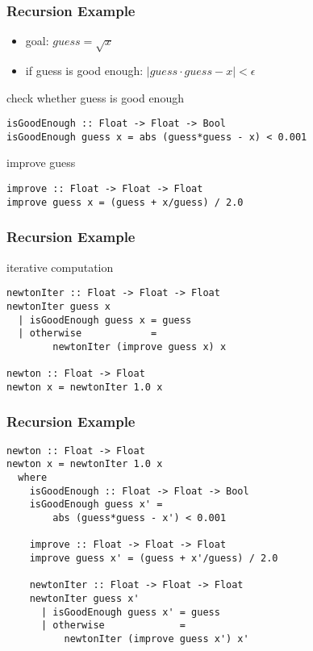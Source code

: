 \documentclass[dvipsnames]{beamer}
\theoremstyle{plain}
\begin{document}
\begin{frame}[fragile]
  \frametitle{Recursion Example}

  \begin{itemize}
    \item goal: $guess = \sqrt x$
    \item if guess is good enough: $|guess \cdot guess - x| < \epsilon$
  \end{itemize}

  \pause
  \begin{exampleblock}{check whether guess is good enough}
    \begin{lstlisting}
isGoodEnough :: Float -> Float -> Bool
isGoodEnough guess x = abs (guess*guess - x) < 0.001
    \end{lstlisting}
  \end{exampleblock}

  \pause
  \begin{exampleblock}{improve guess}
    \begin{lstlisting}
improve :: Float -> Float -> Float
improve guess x = (guess + x/guess) / 2.0
    \end{lstlisting}
  \end{exampleblock}
\end{frame}

\begin{frame}[fragile]
  \frametitle{Recursion Example}

  \begin{exampleblock}{iterative computation}
    \begin{lstlisting}
newtonIter :: Float -> Float -> Float
newtonIter guess x
  | isGoodEnough guess x = guess
  | otherwise            =
        newtonIter (improve guess x) x

newton :: Float -> Float
newton x = newtonIter 1.0 x
    \end{lstlisting}
  \end{exampleblock}
\end{frame}

\begin{frame}[fragile]
  \frametitle{Recursion Example}

  \begin{lstlisting}
newton :: Float -> Float
newton x = newtonIter 1.0 x
  where
    isGoodEnough :: Float -> Float -> Bool
    isGoodEnough guess x' =
        abs (guess*guess - x') < 0.001

    improve :: Float -> Float -> Float
    improve guess x' = (guess + x'/guess) / 2.0

    newtonIter :: Float -> Float -> Float
    newtonIter guess x'
      | isGoodEnough guess x' = guess
      | otherwise             =
          newtonIter (improve guess x') x'
  \end{lstlisting}
\end{frame}
\end{document}
